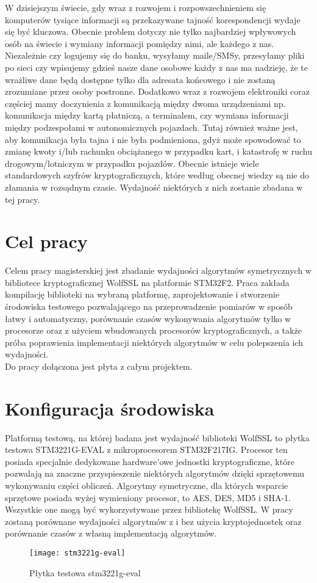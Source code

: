 \documentclass[oneside]{mgr}
\begin{document}
W dzisiejszym świecie, gdy wraz z rozwojem i rozpowszechnieniem się komputerów tysiące informacji są przekazywane tajność korespondencji wydaje się być kluczowa. Obecnie problem dotyczy nie tylko najbardziej wpływowych osób na świecie i wymiany informacji pomiędzy nimi, ale każdego z nas. Niezależnie czy logujemy się do banku, wysyłamy maile/SMSy, przesyłamy pliki po sieci czy wpisujemy gdzieś nasze dane osobowe każdy z nas ma nadzieję, że te wrażliwe dane będą dostępne tylko dla adresata końcowego i nie zostaną zrozumiane przez osoby postronne. Dodatkowo wraz z rozwojem elektroniki coraz częściej mamy doczynienia z komunikacją między dwoma urządzeniami np. komunikacja między kartą płatniczą, a terminalem, czy wymiana informacji między podzespołami w autonomicznych pojazdach. Tutaj również ważne jest, aby komunikacja była tajna i nie była podmieniona, gdyż może spowodować to zmianę kwoty i/lub rachunku obciążanego w przypadku kart, i katastrofę w ruchu drogowym/lotniczym w przypadku pojazdów. Obecnie istnieje wiele standardowych szyfrów kryptograficznych, które według obecnej wiedzy są nie do złamania w rozsądnym czasie. Wydajność niektórych z nich zostanie zbadana w tej pracy.

\chapter{Cel pracy}

Celem pracy magisterskiej jest zbadanie wydajności algorytmów symetrycznych w bibliotece kryptograficznej WolfSSL na platformie STM32F2. Praca zakłada kompilację biblioteki na wybraną platformę, zaprojektowanie i stworzenie środowiska testowego pozwalającego na  przeprowadzenie pomiarów w sposób łatwy i automatyczny, porównanie czasów wykonywania algorytmów tylko w procesorze oraz z użyciem wbudowanych procesorów kryptograficznych, a także próba poprawienia implementacji niektórych algorytmów w celu polepszenia ich wydajności.\\Do pracy dołączona jest płyta z całym projektem.
\chapter{Konfiguracja środowiska}

Platformą testową, na której badana jest wydajność biblioteki WolfSSL to płytka testowa STM3221G-EVAL z mikroprocesorem STM32F217IG. Procesor ten posiada specjalnie dedykowane hardware'owe jednostki kryptograficzne, które pozwalają na znaczne przyspieszenie niektórych algorytmów dzięki sprzętowemu wykonywaniu części obliczeń.  Algorytmy symetryczne, dla których wsparcie sprzętowe posiada wyżej wymieniony procesor, to AES, DES, MD5 i SHA-1. Wszystkie one mogą być wykorzystywane przez bibliotekę WolfSSL. W pracy zostaną porównane wydajności algorytmów z i bez użycia kryptojednostek oraz porównanie czasów z własną implementacją algorytmów.
\begin{center}
\begin{figure}[h]
\texttt{[image: stm3221g-eval]}
\caption{Płytka testowa stm3221g-eval}
\end{figure}

\end{center}
\end{document}
